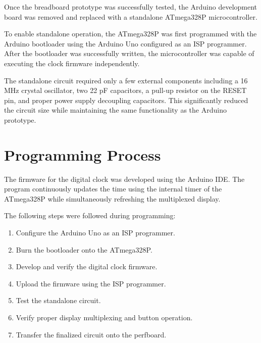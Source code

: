 \documentclass[12pt,a4paper]{article}
\begin{document}
Once the breadboard prototype was successfully tested, the Arduino development board was removed and replaced with a standalone ATmega328P microcontroller.

To enable standalone operation, the ATmega328P was first programmed with the Arduino bootloader using the Arduino Uno configured as an ISP programmer. After the bootloader was successfully written, the microcontroller was capable of executing the clock firmware independently.

The standalone circuit required only a few external components including a 16 MHz crystal oscillator, two 22 pF capacitors, a pull-up resistor on the RESET pin, and proper power supply decoupling capacitors. This significantly reduced the circuit size while maintaining the same functionality as the Arduino prototype.


\section{Programming Process}

The firmware for the digital clock was developed using the Arduino IDE. The program continuously updates the time using the internal timer of the ATmega328P while simultaneously refreshing the multiplexed display.

The following steps were followed during programming:

\begin{enumerate}

\item Configure the Arduino Uno as an ISP programmer.

\item Burn the bootloader onto the ATmega328P.

\item Develop and verify the digital clock firmware.

\item Upload the firmware using the ISP programmer.

\item Test the standalone circuit.

\item Verify proper display multiplexing and button operation.

\item Transfer the finalized circuit onto the perfboard.

\end{enumerate}
\end{document}
